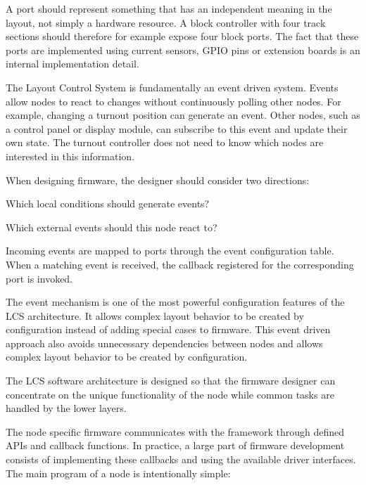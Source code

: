 A port should represent something that has an independent meaning in the layout,
not simply a hardware resource. A block controller with four track sections
should therefore for example expose four block ports. The fact that these ports are
implemented using current sensors, GPIO pins or extension boards is an internal
implementation detail.


The Layout Control System is fundamentally an event driven system. Events allow
nodes to react to changes without continuously polling other nodes.
For example, changing a turnout position can generate an event. Other nodes,
such as a control panel or display module, can subscribe to this event and
update their own state. The turnout controller does not need to know which
nodes are interested in this information.

When designing firmware, the designer should consider two directions:

\begin{smallGapItemize}
    \item Which local conditions should generate events?
    \item Which external events should this node react to?
\end{smallGapItemize}

Incoming events are mapped to ports through the event configuration table. When
a matching event is received, the callback registered for the corresponding port
is invoked.

The event mechanism is one of the most powerful configuration features of the
LCS architecture. It allows complex layout behavior to be created by
configuration instead of adding special cases to firmware.
This event driven approach also avoids unnecessary dependencies between nodes and
allows complex layout behavior to be created by configuration.


The LCS software architecture is designed so that the firmware designer can
concentrate on the unique functionality of the node while common tasks are
handled by the lower layers.

The node specific firmware communicates with the framework through defined APIs
and callback functions. In practice, a large part of firmware development
consists of implementing these callbacks and using the available driver
interfaces.
The main program of a node is intentionally simple:

